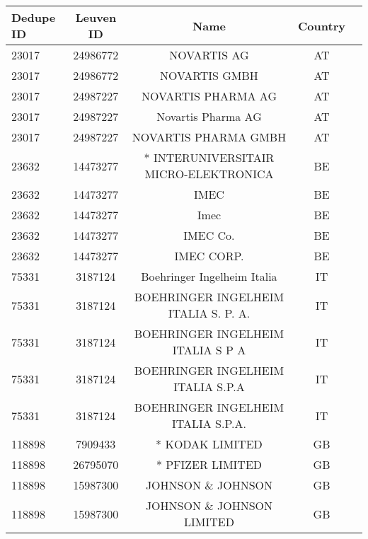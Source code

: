 \begin{longtable}{|l|c|c|c|c|}
\hline
 Dedupe ID &  Leuven ID &                                               Name & Country \\
\hline
     23017 &   24986772 &                                        NOVARTIS AG &      AT \\
     23017 &   24986772 &                                      NOVARTIS GMBH &      AT \\
     23017 &   24987227 &                                 NOVARTIS PHARMA AG &      AT \\
     23017 &   24987227 &                                 Novartis Pharma AG &      AT \\
     23017 &   24987227 &                               NOVARTIS PHARMA GMBH &      AT \\
     23632 &   14473277 &              * INTERUNIVERSITAIR MICRO-ELEKTRONICA &      BE \\
     23632 &   14473277 &                                               IMEC &      BE \\
     23632 &   14473277 &                                               Imec &      BE \\
     23632 &   14473277 &                                           IMEC Co. &      BE \\
     23632 &   14473277 &                                         IMEC CORP. &      BE \\
     75331 &    3187124 &                        Boehringer Ingelheim Italia &      IT \\
     75331 &    3187124 &               BOEHRINGER INGELHEIM ITALIA S. P. A. &      IT \\
     75331 &    3187124 &                  BOEHRINGER INGELHEIM ITALIA S P A &      IT \\
     75331 &    3187124 &                  BOEHRINGER INGELHEIM ITALIA S.P.A &      IT \\
     75331 &    3187124 &                 BOEHRINGER INGELHEIM ITALIA S.P.A. &      IT \\
    118898 &    7909433 &                                    * KODAK LIMITED &      GB \\
    118898 &   26795070 &                                   * PFIZER LIMITED &      GB \\
    118898 &   15987300 &                                  JOHNSON \& JOHNSON &      GB \\
    118898 &   15987300 &                          JOHNSON \& JOHNSON LIMITED &      GB \\

\end{longtable}
